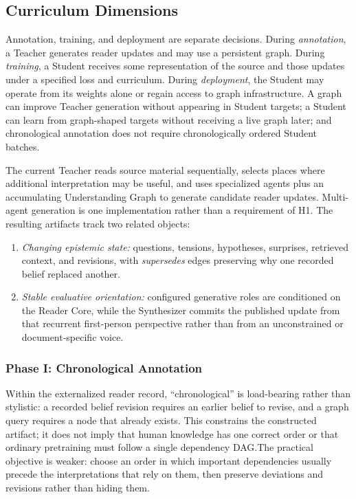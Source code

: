 \subsection{Curriculum Dimensions}\label{sec:concept-to-curriculum}

Annotation, training, and deployment are separate decisions. During
\emph{annotation}, a Teacher generates reader updates and may use a persistent
graph. During \emph{training}, a Student receives some representation of the
source and those updates under a specified loss and curriculum. During
\emph{deployment}, the Student may operate from its weights alone or regain
access to graph infrastructure. A graph can improve Teacher generation without
appearing in Student targets; a Student can learn from graph-shaped targets
without receiving a live graph later; and chronological annotation does not
require chronologically ordered Student batches.

The current Teacher reads source material sequentially, selects places where
additional interpretation may be useful, and uses specialized agents plus an
accumulating Understanding Graph to generate candidate reader updates.
Multi-agent generation is one implementation rather than a requirement of H1.
The resulting artifacts track two related objects:

\begin{enumerate}[leftmargin=*,itemsep=0.3em]
    \item \emph{Changing epistemic state:} questions, tensions, hypotheses,
    surprises, retrieved context, and revisions, with \emph{supersedes} edges
    preserving why one recorded belief replaced another.
    \item \emph{Stable evaluative orientation:} configured generative roles are
    conditioned on the Reader Core, while the Synthesizer commits the published
    update from that recurrent first-person perspective rather than from an
    unconstrained or document-specific voice.
\end{enumerate}

\subsubsection{Phase I: Chronological Annotation}\label{sec:annotation-phase}

Within the externalized reader record, ``chronological'' is load-bearing rather
than stylistic: a recorded belief revision requires an earlier belief to revise,
and a graph query requires a node that already exists. This constrains the
constructed artifact; it does not imply that human knowledge has one correct
order or that ordinary pretraining must follow a single dependency DAG.\@ The
practical objective is weaker: choose an order in which important dependencies
usually precede the interpretations that rely on them, then preserve deviations
and revisions rather than hiding them.

